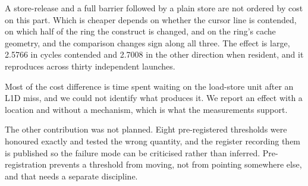 \documentclass[conference]{IEEEtran}
\begin{document}
A store-release and a full barrier followed by a plain store are not ordered by
cost on this part. Which is cheaper depends on whether the cursor line is
contended, on which half of the ring the construct is changed, and on the ring's
cache geometry, and the comparison changes sign along all three. The effect is
large, 2.5766 in cycles contended and 2.7008 in the other direction when
resident, and it reproduces across thirty independent launches.

Most of the cost difference is time spent waiting on the load-store unit after
an L1D miss, and we could not identify what produces it. We report an effect
with a location and without a mechanism, which is what the measurements
support.

The other contribution was not planned. Eight pre-registered thresholds were
honoured exactly and tested the wrong quantity, and the register recording them
is published so the failure mode can be criticised rather than inferred.
Pre-registration prevents a threshold from moving, not from pointing somewhere
else, and that needs a separate discipline.



\end{document}
